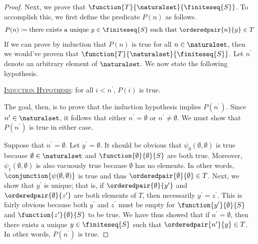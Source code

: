 \begin{proof}
    \vspace{0.3cm}
    \noindent
    Next, we prove that \( \function{T}{\naturalset}{\finiteseq{S}} \).
    To accomplish this, we first define the predicate \( P(n) \) as follows.
    \begin{equation*}
        P(n) \coloneq \text{there exists a unique \( y \in \finiteseq{S} \) such that \( \orderedpair{n}{y} \in T \)}
    \end{equation*}
    If we can prove by induction that \( P(n) \) is true for all \( n \in \naturalset \), then we would've proven that \( \function{T}{\naturalset}{\finiteseq{S}} \).
    Let \( n^{\prime} \) denote an arbitrary element of \( \naturalset \).
    We now state the following hypothesis.

    \vspace{0.3cm}
    \noindent
    \underline{\scshape Induction Hypothesis}: for all \( i < n^{\prime} \), \( P(i) \) is true.

    \vspace{0.3cm}
    \noindent
    The goal, then, is to prove that the induction hypothesis implies \( P(n^{\prime}) \).
    Since \( n^{\prime} \in \naturalset \), it follows that either \( n^{\prime} = \emptyset \) or \( n^{\prime} \neq \emptyset \).
    We must show that \( P(n^{\prime}) \) is true in either case.

    \vspace{0.3cm}
    \noindent
    Suppose that \( n^{\prime} = \emptyset \).
    Let \( y^{\prime} = \emptyset \).
    It should be obvious that \( \psi_{0}(\emptyset, \emptyset) \) is true because \( \emptyset \in \naturalset \) and
    \( \function{\emptyset}{\emptyset}{S} \) are both true.
    Moreover, \( \psi_{1}(\emptyset, \emptyset) \) is also vacuously true because \( \emptyset \) has no elements.
    In other words, \( \conjunction{\psi(\emptyset, \emptyset)} \) is true and thus \( \orderedpair{\emptyset}{\emptyset} \in T \).
    Next, we show that \( y^{\prime} \) is unique; that is, if \( \orderedpair{\emptyset}{y^{\prime}} \) and \( \orderedpair{\emptyset}{z^{\prime}} \)
    are both elements of \( T \), then necessarily \( y^{\prime} = z^{\prime} \).
    This is fairly obvious because both \( y^{\prime} \) and \( z^{\prime} \) must be empty for \( \function{y^{\prime}}{\emptyset}{S} \)
    and \( \function{z^{\prime}}{\emptyset}{S} \) to be true.
    We have thus showed that if \( n^{\prime} = \emptyset \), then there exists a unique \( y \in \finiteseq{S} \) such that
    \( \orderedpair{n^{\prime}}{y} \in T \).
    In other words, \( P(n^{\prime}) \) is true.


\end{proof}
